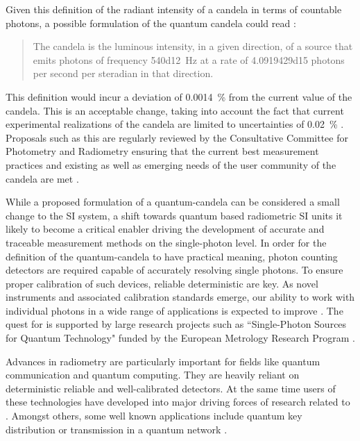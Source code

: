 	Given this definition of the radiant intensity of a candela in terms of countable photons, a possible formulation of the quantum candela could read \cite{Cheung2007}:

	\begin{quote}
		The candela is the luminous intensity, in a given direction, of a source that emits photons of frequency \SI{540d12}{\hertz} at a rate of \num{4.0919429d15} photons per second per steradian in that direction.
	\end{quote}

	This definition would incur a deviation of \SI{0.0014}{\percent} from the current value of the candela. This is an acceptable change, taking into account the fact that current experimental realizations of the candela are limited to uncertainties of \SI{0.02}{\percent} \cite{Cheung2007}. Proposals such as this are regularly reviewed by the Consultative Committee for Photometry and Radiometry ensuring that the current best measurement practices and existing as well as emerging needs of the user community of the candela are met \cite{zwinkels2010photometry}.

	While a proposed formulation of a quantum-candela can be considered a small change to the SI system, a shift towards quantum based radiometric SI units it likely to become a critical enabler driving the development of accurate and traceable measurement methods on the single-photon level. In order for the definition of the quantum-candela to have practical meaning, photon counting detectors are required capable of accurately resolving single photons. To ensure proper calibration of such devices, reliable deterministic \spss are key. As novel instruments and associated calibration standards emerge, our ability to work with individual photons in a wide range of applications is expected to improve \cite{buller2009single, eisaman2011invited, sangouard2012single, chunnilall2014metrology}. The quest for \spss is supported by large research projects such as ``Single-Photon Sources for Quantum Technology" funded by the European Metrology Research Program \cite{SiquteProject,QuCandelaProject}.

	Advances in radiometry are particularly important for fields like quantum communication and quantum computing. They are heavily reliant on deterministic reliable \spss and well-calibrated detectors. At the same time users of these technologies have developed into major driving forces of research related to \spss \cite{scheel2009single, chunnilall2014metrology}. Amongst others, some well known applications include quantum key distribution \cite{bennett2014quantum, beveratos2002single, alleaume2004experimental} or transmission in a quantum network \cite{childress2006fault, bernien2012two, pfaff2014unconditional}.

